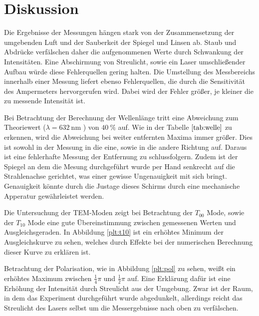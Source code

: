 \newpage
\section{Diskussion}
Die Ergebnisse der Messungen hängen stark von der Zusammensetzung der umgebenden
Luft und der Sauberkeit der Spiegel und Linsen ab. Staub und Abdrücke verfälschen
daher die aufgenommenen Werte durch Schwankung der Intensitäten. Eine
Abschirmung von Streulicht, sowie ein Laser umschließender Aufbau würde diese
Fehlerquellen gering halten.
Die Umstellung des Messbereichs innerhalb einer Messung liefert ebenso
Fehlerquellen, die durch die Sensitivität des Ampermeters hervorgerufen wird.
Dabei wird der Fehler größer, je kleiner die zu messende Intensität ist.

Bei Betrachtung der Berechnung der Wellenlänge tritt eine Abweichung zum
Theoriewert ($\lambda = \SI{632}{\nano\meter}$ \cite{anleitung}) von $\SI{40}{\percent}$ auf.
Wie in der Tabelle $\ref{tab:welle}$ zu erkennen, wird die Abweichung bei
weiter entfernten Maxima immer größer. Dies ist sowohl in der Messung in die
eine, sowie in die andere Richtung auf. Daraus ist eine fehlerhafte Messung der
Entfernung zu schlussfolgern. Zudem ist der Spiegel an dem die Mesung durchgeführt
wurde per Hand senkrecht auf die Strahlenachse gerichtet, was einer gewisse
Ungenauigkeit mit sich bringt. Genauigkeit könnte durch die Justage dieses
Schirms durch eine mechanische Apperatur gewährleistet werden.

Die Untersuchung der TEM-Moden zeigt bei Betrachtung der $T_{00}$ Mode, sowie
der $T_{10}$ Mode eine gute Übereinstimmung zwischen gemessenen Werten und
Ausgleichsgeraden. In Abbildung \ref{plt:t10} ist ein erhöhtes Minimum der
Ausgleichskurve zu sehen, welches durch Effekte bei der numerischen Berechnung
dieser Kurve zu erklären ist.

Betrachtung der Polarisation, wie in Abbildung \ref{plt:pol} zu sehen, weißt
ein erhöhtes Maximum zwischen $\frac{1}{4}\pi$ und $\frac{1}{2}\pi$ auf. Eine
Erklärung dafür ist eine Erhöhung der Intensität durch Streulicht aus der
Umgebung. Zwar ist der Raum, in dem das Experiment durchgeführt wurde abgedunkelt,
allerdings reicht das Streulicht des Lasers selbst um die Messergebnisse nach
oben zu verfälschen.

